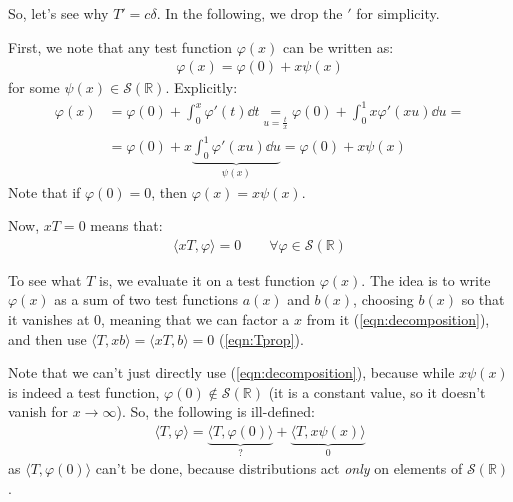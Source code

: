 \documentclass[../template.tex]{subfiles}
\begin{document}
\begin{expl}
    \medskip

    So, let's see why $T' = c \delta$. In the following, we drop the $'$ for simplicity.
    
    First, we note that any test function $\varphi(x)$ can be written as:
    \begin{align*}
        \varphi(x) = \varphi(0) + x \psi(x) 
    \end{align*}
    for some $\psi(x) \in \mathcal{S}(\mathbb{R})$. Explicitly:
    \begin{align} \nonumber
        \varphi(x) &= \varphi(0) + \int_0^x \varphi'(t) \dd{t} \underset{u = \frac{t}{x} }{=} \varphi(0) + \int_0^1 x \varphi'(xu) \dd{u} =\\
        &= \varphi(0) + x \underbrace{\int_0^1 \varphi'(xu) \dd{u}}_{\psi(x)} = \varphi(0) + x\psi(x) \label{eqn:decomposition}
    \end{align}
    Note that if $\varphi(0) = 0$, then $\varphi(x) = x \psi(x)$. 

    \medskip

    Now, $x T = 0$ means that:
    \begin{align} \label{eqn:Tprop}
        \langle x T, \varphi \rangle = 0 \qquad \forall \varphi \in \mathcal{S}(\mathbb{R})
    \end{align}

    To see what $T$ is, we evaluate it on a test function $\varphi(x)$. The idea is to write $\varphi(x)$ as a sum of two test functions $a(x)$ and $b(x)$, choosing $b(x)$ so that it vanishes at $0$, meaning that we can factor a $x$ from it (\ref{eqn:decomposition}), and then use $\langle T, x b \rangle = \langle xT, b \rangle = 0$ (\ref{eqn:Tprop}).

    Note that we can't just directly use (\ref{eqn:decomposition}), because while $x \psi(x)$ is indeed a test function, $\varphi(0) \notin \mathcal{S}(\mathbb{R})$ (it is a constant value, so it doesn't vanish for $x \to \infty$). So, the following is ill-defined:
    \begin{align*}
        \langle T, \varphi \rangle = \underbrace{\langle T, \varphi(0) \rangle}_{?}  + \underbrace{\langle T, x \psi(x) \rangle}_{0} 
    \end{align*}
    as $\langle T, \varphi(0) \rangle$ can't be done, because distributions act \textit{only} on elements of $\mathcal{S}(\mathbb{R})$.

    \medskip


\end{expl}
\end{document}
